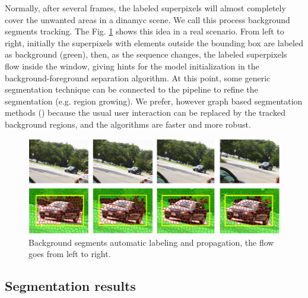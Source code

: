 Normally, after several frames, 
the labeled superpixels will almost completely cover the unwanted areas in a dinamyc scene. We call this process background segments tracking.  The Fig. \ref{figurelabel_spflow} shows this idea in a real scenario. From left to right, initially the superpixels with 
elements outside the bounding box are labeled as background (green), then, as the sequence changes, the labeled superpixels flow inside the window, giving hints for the model initialization in the background-foreground separation algorithm. 
At this point, some generic segmentation technique can be connected to the pipeline to refine the segmentation (e.g. region growing). We prefer, however graph based segmentation methods (\cite{c18}\cite{c15}) because the usual user interaction can be replaced by the tracked background regions, and the algorithms are faster and more robust.

   \begin{figure}[thpb]
      \centering
      \includegraphics[width=1\textwidth]{../images/suppixflow2.png}
      \caption{Background segments automatic labeling and propagation, the flow goes from left to right.}
      \label{figurelabel_spflow}
   \end{figure}

\subsection{Segmentation results}

